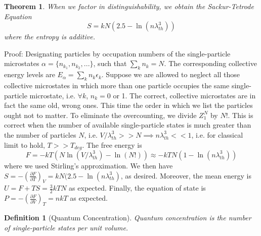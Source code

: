 \documentclass[a4paper]{article}
\newtheorem{defi}{Definition}[section]
\newtheorem{thm}{Theorem}[section]
\theoremstyle{new}
\begin{document}
\begin{thm}
When we factor in distinguishability, we obtain the Sackur-Tetrode Equation
$$S=kN(2.5-\ln(n\lambda_{th}^3))$$
where the entropy is additive.
\end{thm}
Proof: Designating particles by occupation numbers of the single-particle microstates $\alpha=\{n_{k_1},n_{k_2},...\}$, such that $\sum_kn_k=N$. The corresponding collective energy levels are $E_\alpha=\sum_kn_k\epsilon_k$. Suppose we are allowed to neglect all those collective microstates in which more than one particle occupies the same single-particle microstate, i.e. $\forall k$, $n_k=0$ or 1. The correct, collective microstates are in fact the same old, wrong ones. This time the order in which we list the particles ought not to matter. To eliminate the overcounting, we divide $Z_1^N$ by $N!$. This is correct when the number of available single-particle states is much greater than the number of particles $N$, i.e. $V/\lambda_{th}^3>>N\implies n\lambda_{th}^3<<1$, i.e. for classical limit to hold, $T>>T_{deg}$. The free energy is
$$F=-kT(N\ln(V/\lambda_{th}^3)-\ln(N!))\approx -kTN(1-\ln(n\lambda_{th}^3))$$
where we used Stirling's approximation. We then have $S=-(\frac{\partial F}{\partial T})_V=kN(2.5-\ln(n\lambda_{th}^3)$, as desired. Moreover, the mean energy is $U=F+TS=\frac{3}{2}kTN$ as expected. Finally, the equation of state is $P=-(\frac{\partial F}{\partial V})_T=nkT$ as expected.
\begin{defi}[Quantum Concentration]
Quantum concentration is the number of single-particle states per unit volume.
\end{defi}
\newpage
\end{document}
